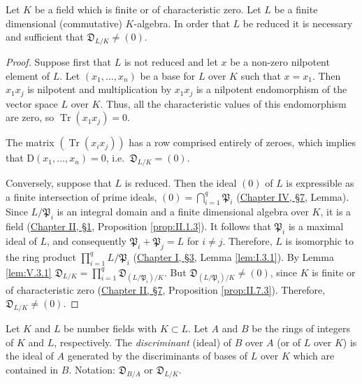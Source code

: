 \begin{lemma}
\label{lem:V.3.3}
Let $K$ be a field which is finite or of characteristic zero. Let $L$ be a
finite dimensional (commutative) $K$-algebra. In order that $L$ be reduced
it is necessary and sufficient that $\mathfrak{D}_{L/K}\neq(0)$.
\end{lemma}

\begin{proof}
Suppose first that $L$ is not reduced and let $x$ be a non-zero nilpotent
element of $L$. Let $(x_{1},\ldots,x_{n})$ be a base for $L$ over $K$ such
that $x=x_{1}$. Then $x_{1}x_{j}$ is nilpotent and multiplication by
$x_{1}x_{j}$ is a nilpotent endomorphism of the vector space $L$ over $K$.
Thus, all the characteristic values of this endomorphism are zero, so
$\operatorname{Tr}(x_{1}x_{j})=0$.

The matrix $(\operatorname{Tr}(x_{i}x_{j}))$ has a row comprised entirely of
zeroes, which implies that $\mathrm{D}(x_{1},\ldots,x_{n})=0$, i.e.\
$\mathfrak{D}_{L/K}=(0)$.

Conversely, suppose that $L$ is reduced. Then the ideal $(0)$ of $L$ is
expressible as a finite intersection of prime ideals,
$(0)=\bigcap_{i=1}^{q}\mathfrak{P}_{i}$ (\hyperref[sec:4.7]{Chapter IV, §7}, Lemma). Since
$L/\mathfrak{P}_{i}$ is an integral domain and a finite dimensional algebra
over $K$, it is a field (\hyperref[sec:2.1]{Chapter II, §1}, Proposition \ref{prop:II.1.3}). It
follows that $\mathfrak{P}_{i}$ is a maximal ideal of $L$, and consequently
$\mathfrak{P}_{i}+\mathfrak{P}_{j}=L$ for $i\neq j$. Therefore, $L$ is
isomorphic to the ring product $\prod_{i=1}^{q}L/\mathfrak{P}_{i}$ (\hyperref[sec:1.3]{Chapter
I, §3}, Lemma \ref{lem:I.3.1}). By Lemma \ref{lem:V.3.1}
$\mathfrak{D}_{L/K}=\prod_{i=1}^{q}\mathfrak{D}_{(L/\mathfrak{P}_{i})/K}$.
But $\mathfrak{D}_{(L/\mathfrak{P}_{i})/K}\neq(0)$, since $K$ is finite or
of characteristic zero (\hyperref[sec:2.7]{Chapter II, §7}, Proposition \ref{prop:II.7.3}).
Therefore, $\mathfrak{D}_{L/K}\neq(0)$.
\end{proof}

\begin{definition}
\label{def:V.3.1}
Let $K$ and $L$ be number fields with $K\subset L$. Let $A$ and $B$ be the
rings of integers of $K$ and $L$, respectively. The \emph{discriminant}
(ideal) of $B$ over $A$ (or of $L$ over $K$) is the ideal of $A$ generated
by the discriminants of bases of $L$ over $K$ which are contained in $B$.
Notation: $\mathfrak{D}_{B/A}$ or $\mathfrak{D}_{L/K}$.
\end{definition}

